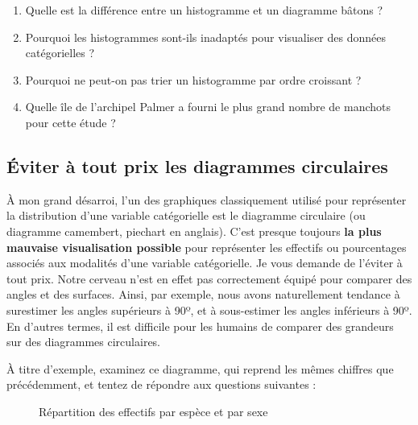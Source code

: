 \documentclass[
  a4paper,
  DIV=11,
  numbers=noendperiod,
  oneside]{scrreprt}
\providecommand{\tightlist}{%
  \setlength{\itemsep}{0pt}\setlength{\parskip}{0pt}}\usepackage{longtable,booktabs,array}
\begin{document}
\begin{enumerate}
\def\labelenumi{\arabic{enumi}.}
\tightlist
\item
  Quelle est la différence entre un histogramme et un diagramme bâtons ?
\item
  Pourquoi les histogrammes sont-ils inadaptés pour visualiser des
  données catégorielles ?
\item
  Pourquoi ne peut-on pas trier un histogramme par ordre croissant ?
\item
  Quelle île de l'archipel Palmer a fourni le plus grand nombre de
  manchots pour cette étude ?
\end{enumerate}

\subsection{Éviter à tout prix les diagrammes
circulaires}\label{sec-pie}

À mon grand désarroi, l'un des graphiques classiquement utilisé pour
représenter la distribution d'une variable catégorielle est le diagramme
circulaire (ou diagramme camembert, piechart en anglais). C'est presque
toujours \textbf{la plus mauvaise visualisation possible} pour
représenter les effectifs ou pourcentages associés aux modalités d'une
variable catégorielle. Je vous demande de l'éviter à tout prix. Notre
cerveau n'est en effet pas correctement équipé pour comparer des angles
et des surfaces. Ainsi, par exemple, nous avons naturellement tendance à
surestimer les angles supérieurs à 90º, et à sous-estimer les angles
inférieurs à 90º. En d'autres termes, il est difficile pour les humains
de comparer des grandeurs sur des diagrammes circulaires.

À titre d'exemple, examinez ce diagramme, qui reprend les mêmes chiffres
que précédemment, et tentez de répondre aux questions suivantes :

\begin{figure}


\caption{\label{fig-pie}Répartition des effectifs par espèce et par
sexe}

\end{figure}%
\end{document}

